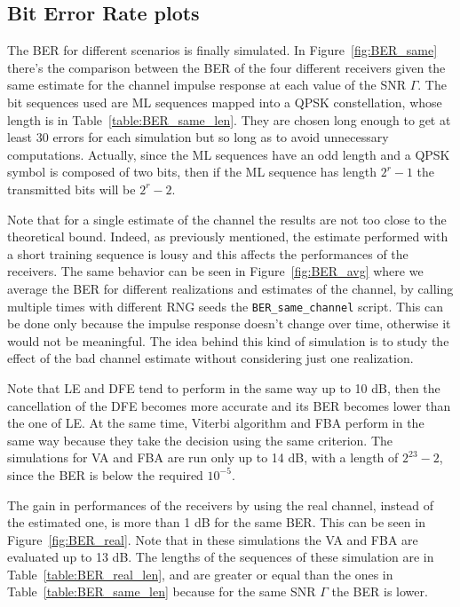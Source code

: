 \documentclass[10pt]{article}
\begin{document}

\subsection*{Bit Error Rate plots}
The BER for different scenarios is finally simulated. In Figure~\ref{fig:BER_same} there's the comparison between the BER of the four different receivers given the same estimate for the channel impulse response at each value of the SNR $\Gamma$. The bit sequences used are ML sequences mapped into a QPSK constellation, whose length is in Table~\ref{table:BER_same_len}. They are chosen long enough to get at least 30 errors for each simulation but so long as to avoid unnecessary computations. Actually, since the ML sequences have an odd length and a QPSK symbol is composed of two bits, then if the ML sequence has length $2^r - 1$ the transmitted bits will be $2^r - 2$.

Note that for a single estimate of the channel the results are not too close to the theoretical bound. Indeed, as previously mentioned, the estimate performed with a short training sequence is lousy and this affects the performances of the receivers. The same behavior can be seen in Figure~\ref{fig:BER_avg} where we average the BER for different realizations and estimates of the channel, by calling multiple times with different RNG seeds the \texttt{BER\_same\_channel} script. This can be done only because the impulse response doesn't change over time, otherwise it would not be meaningful. The idea behind this kind of simulation is to study the effect of the bad channel estimate without considering just one realization.

Note that LE and DFE tend to perform in the same way up to 10 dB, then the cancellation of the DFE becomes more accurate and its BER becomes lower than the one of LE. At the same time, Viterbi algorithm and FBA perform in the same way because they take the decision using the same criterion. The simulations for VA and FBA are run only up to 14 dB, with a length of $2^{23} - 2$, since the BER is below the required $10^{-5}$.

The gain in performances of the receivers by using the real channel, instead of the estimated one, is more than 1 dB for the same BER. This can be seen in Figure~\ref{fig:BER_real}. Note that in these simulations the VA and FBA are evaluated up to 13 dB. The lengths of the sequences of these simulation are in Table~\ref{table:BER_real_len}, and are greater or equal than the ones in Table~\ref{table:BER_same_len} because for the same SNR $\Gamma$ the BER is lower.  
\end{document}
